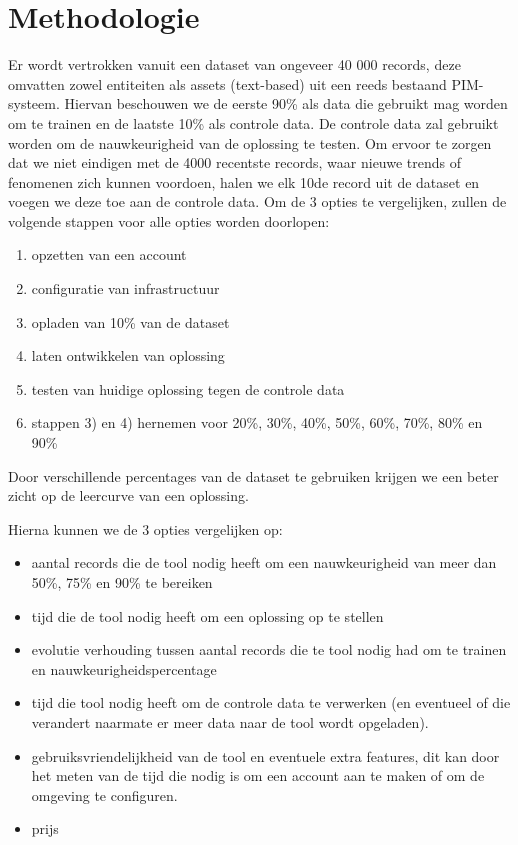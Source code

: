 \section{Methodologie}%
\label{sec:methodologie}

Er wordt vertrokken vanuit een dataset van ongeveer 40 000 records, deze omvatten zowel entiteiten als assets (text-based) uit een reeds bestaand PIM-systeem. Hiervan beschouwen we de eerste 90\% als data die gebruikt mag worden om te trainen en de laatste 10\% als controle data. De controle data zal gebruikt worden om de nauwkeurigheid van de oplossing te testen. Om ervoor te zorgen dat we niet eindigen met de 4000 recentste records, waar nieuwe trends of fenomenen zich kunnen voordoen, halen we elk 10de record uit de dataset en voegen we deze toe aan de controle data.
Om de 3 opties te vergelijken, zullen de volgende stappen voor alle opties worden doorlopen:

\begin{enumerate}
	\item opzetten van een account
	\item configuratie van infrastructuur
	\item opladen van 10\% van de dataset
	\item laten ontwikkelen van oplossing
	\item testen van huidige oplossing tegen de controle data
	\item stappen 3) en 4) hernemen voor 20\%, 30\%, 40\%, 50\%, 60\%, 70\%, 80\% en 90\%
\end{enumerate}

Door verschillende percentages van de dataset te gebruiken krijgen we een beter zicht op de leercurve van een oplossing.

Hierna kunnen we de 3 opties vergelijken op: 
\begin{itemize}
	\item aantal records die de tool nodig heeft om een nauwkeurigheid van meer dan 50\%, 75\% en 90\% te bereiken
	\item tijd die de tool nodig heeft om een oplossing op te stellen
	\item evolutie verhouding tussen aantal records die te tool nodig had om te trainen en nauwkeurigheidspercentage
	\item tijd die tool nodig heeft om de controle data te verwerken (en eventueel of die verandert naarmate er meer data naar de tool wordt opgeladen).
	\item gebruiksvriendelijkheid van de tool en eventuele extra features, dit kan door het meten van de tijd die nodig is om een account aan te maken of om de omgeving te configuren.  
	\item prijs
\end{itemize}


